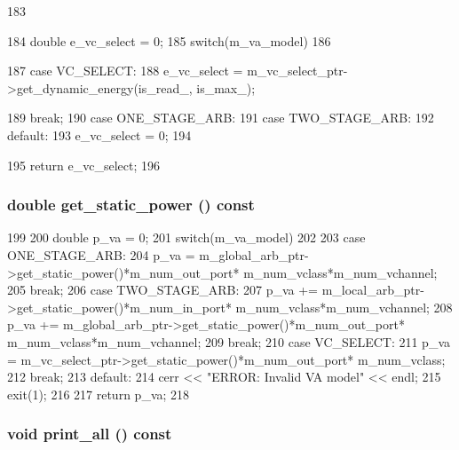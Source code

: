 \begin{DoxyCode}
183 {
184     double e_vc_select = 0;
185     switch(m_va_model)
186     {
187         case VC_SELECT:
188             e_vc_select = m_vc_select_ptr->get_dynamic_energy(is_read_, is_max_);
      
189             break;
190         case ONE_STAGE_ARB:
191         case TWO_STAGE_ARB:
192         default:
193             e_vc_select = 0;
194     }
195     return e_vc_select;
196 }
\end{DoxyCode}
\hypertarget{classVCAllocator_aeb5933543cfdeb1668baed5ce7c68351}{
\subsubsection[{get\_\-static\_\-power}]{\setlength{\rightskip}{0pt plus 5cm}double get\_\-static\_\-power () const}}
\label{classVCAllocator_aeb5933543cfdeb1668baed5ce7c68351}



\begin{DoxyCode}
199 {
200     double p_va = 0;
201     switch(m_va_model)
202     {
203         case ONE_STAGE_ARB:
204             p_va = m_global_arb_ptr->get_static_power()*m_num_out_port*
      m_num_vclass*m_num_vchannel;
205             break;
206         case TWO_STAGE_ARB:
207             p_va += m_local_arb_ptr->get_static_power()*m_num_in_port*
      m_num_vclass*m_num_vchannel;
208             p_va += m_global_arb_ptr->get_static_power()*m_num_out_port*
      m_num_vclass*m_num_vchannel;
209             break;   
210         case VC_SELECT:
211             p_va = m_vc_select_ptr->get_static_power()*m_num_out_port*
      m_num_vclass;
212             break;
213         default:
214             cerr << "ERROR: Invalid VA model" << endl;
215             exit(1);
216     }
217     return p_va;
218 }
\end{DoxyCode}
\hypertarget{classVCAllocator_a8404831790e4809674f0249ef6505cd5}{
\subsubsection[{print\_\-all}]{\setlength{\rightskip}{0pt plus 5cm}void print\_\-all () const}}
\label{classVCAllocator_a8404831790e4809674f0249ef6505cd5}



